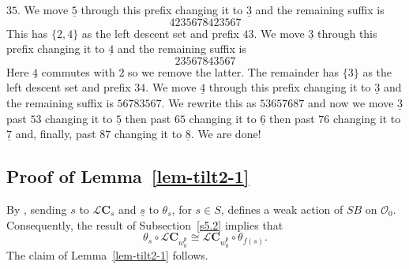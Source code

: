 \documentclass[a4paper]{amsart}
\begin{document}
$35$. We move $\underline{5}$ through this prefix 
changing it to $\underline{3}$ and the remaining
suffix is
\begin{displaymath}
4235678423567
\end{displaymath}
This has $\{2,4\}$ as the left descent set and prefix 
$43$. We move $\underline{3}$ through this prefix 
changing it to $\underline{4}$ and the remaining
suffix is
\begin{displaymath}
23567843567
\end{displaymath}
Here $\underline{4}$ commutes with $2$ so we remove
the latter. The remainder has $\{3\}$ 
as the left descent set and prefix 
$34$. We move $\underline{4}$ through this prefix 
changing it to $\underline{3}$ and the remaining
suffix is $56783567$. We rewrite this as $53657687$
and now we move $\underline{3}$ past $53$
changing it to $\underline{5}$ then past $65$
changing it to $\underline{6}$ then past $76$
changing it to $\underline{7}$ and, finally,  past $87$
changing it to $\underline{8}$. We are done!

\subsection{Proof of Lemma~\ref{lem-tilt2-1}}\label{s5.9}

By \cite[Theorem~7.3]{J-Z}, sending $s$ to $\mathcal{L}\mathbf{C}_{s}$
and  $\underline{s}$ to $\theta_s$, for $s\in S$, defines a weak
action of $SB$ on $\mathcal{O}_0$. Consequently, 
the result of Subsection~\ref{s5.2} implies that 
\begin{displaymath}
\theta_s\circ \mathcal{L}\mathbf{C}_{w_0^\mathfrak{p}} \cong
\mathcal{L}\mathbf{C}_{w_0^\mathfrak{p}}\circ \theta_{f(s)}.
\end{displaymath}
The claim of Lemma~\ref{lem-tilt2-1} follows.
\end{document}
